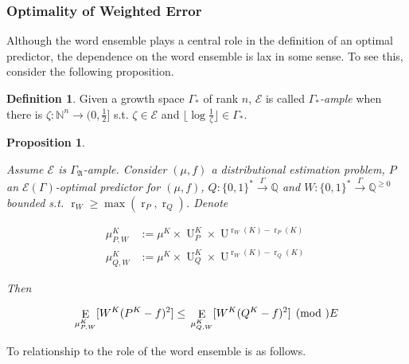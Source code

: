 \documentclass{article}
\numberwithin{equation}{section}
\theoremstyle{definition}
\newtheorem{definition}{Definition}[section]
\theoremstyle{plain}
\newtheorem{proposition}{Proposition}[section]
\newcommand{\Bool}{\{0,1\}}
\newcommand{\Words}{{\Bool^*}}
\DeclareMathOperator{\E}{E}
\DeclareMathOperator{\R}{r}
\DeclareMathOperator{\Un}{U}
\newcommand{\Nats}{\mathbb{N}}
\newcommand{\Rats}{\mathbb{Q}}
\newcommand{\Floor}[1]{\lfloor #1 \rfloor}
\newcommand{\GrowA}{\Gamma_{\mathfrak{A}}}
\newcommand{\Fall}{\mathcal{E}}
\newcommand{\EG}{\Fall(\Gamma)}
\newcommand{\Scheme}{\xrightarrow{\Gamma}}
\begin{document}
\subsubsection{Optimality of Weighted Error}

Although the word ensemble plays a central role in the definition of an optimal predictor, the dependence on the word ensemble is lax in some sense. To see this, consider the following proposition.

\begin{definition}

Given a growth space $\Gamma_*$ of rank $n$, $\Fall$ is called \emph{$\Gamma_*$-ample} when there is $\zeta: \Nats^n \rightarrow (0,\frac{1}{2}]$ s.t.  $\zeta \in \Fall$ and $\Floor{\log \frac{1}{\zeta}} \in \Gamma_*$.

\end{definition}

\begin{proposition}
\label{prp:weight}

Assume $\Fall$ is $\GrowA$-ample. Consider $(\mu,f)$ a distributional estimation problem, $P$ an $\EG$-optimal predictor for $(\mu,f)$, $Q: \Words \Scheme \Rats$ and ${W: \Words \Scheme \Rats^{\geq 0}}$ bounded s.t. ${\R_W \geq \max(\R_P, \R_Q)}$. Denote 

\begin{align*}
\mu^{K}_{P,W} &:=\mu^{K} \times \Un_P^{K} \times \Un^{\R_W(K)-\R_P(K)} \\
\mu^{K}_{Q,W} &:=\mu^{K} \times \Un_Q^{K} \times \Un^{\R_W(K)-\R_Q(K)}
\end{align*}

Then

\begin{equation}
\E_{\mu^{K}_{P,W}}[W^{K}(P^{K} - f)^2] \leq \\ \E_{\mu^{K}_{Q,W}}[W^{K}(Q^{K} - f)^2] \pmod \Fall
\end{equation}

\end{proposition}

To relationship to the role of the word ensemble is as follows.
\end{document}
